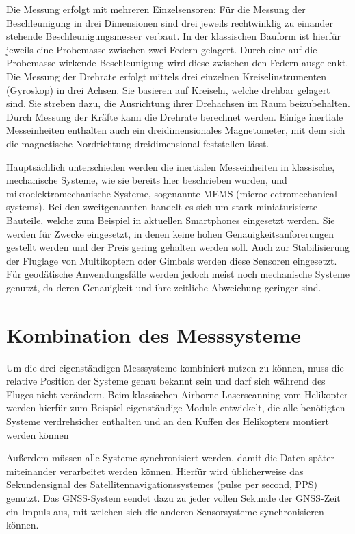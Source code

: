 \documentclass[a4paper,12pt,bibliography=totoc, listof=totoc,titlepage,pointlessnumbers]{scrreprt}
\begin{document}
Die Messung erfolgt mit mehreren Einzelsensoren: Für die Messung der Beschleunigung in drei Dimensionen sind drei jeweils rechtwinklig zu einander stehende Beschleunigungsmesser verbaut. In der klassischen Bauform ist hierfür jeweils eine Probemasse zwischen zwei Federn gelagert. Durch eine auf die Probemasse wirkende Beschleunigung wird diese zwischen den Federn ausgelenkt. Die Messung der Drehrate erfolgt mittels drei einzelnen Kreiselinstrumenten (Gyroskop) in drei Achsen. Sie basieren auf Kreiseln, welche drehbar gelagert sind. Sie streben dazu, die Ausrichtung ihrer Drehachsen im Raum beizubehalten. Durch Messung der Kräfte kann die Drehrate berechnet werden. Einige inertiale Messeinheiten enthalten auch ein dreidimensionales Magnetometer, mit dem sich die magnetische Nordrichtung dreidimensional feststellen lässt.

Hauptsächlich unterschieden werden die inertialen Messeinheiten in klassische, mechanische Systeme, wie sie bereits hier beschrieben wurden, und mikroelektromechanische Systeme, sogenannte MEMS (microelectromechanical systems). Bei den zweitgenannten handelt es sich um stark miniaturisierte Bauteile, welche zum Beispiel in aktuellen Smartphones eingesetzt werden. Sie werden für Zwecke eingesetzt, in denen keine hohen Genauigkeitsanforerungen gestellt werden und der Preis gering gehalten werden soll. Auch zur Stabilisierung der Fluglage von Multikoptern oder Gimbals werden diese Sensoren eingesetzt. Für geodätische Anwendungsfälle werden jedoch meist noch mechanische Systeme genutzt, da deren Genauigkeit und ihre zeitliche Abweichung geringer sind.


\section{Kombination des Messsysteme}
Um die drei eigenständigen Messsysteme kombiniert nutzen zu können, muss die relative Position der Systeme genau bekannt sein und darf sich während des Fluges nicht verändern. Beim klassischen Airborne Laserscanning vom Helikopter werden hierfür zum Beispiel eigenständige Module entwickelt, die alle benötigten Systeme verdrehsicher enthalten und an den Kuffen des Helikopters montiert werden können \citep[S. 23f]{beraldin}

Außerdem müssen alle Systeme synchronisiert werden, damit die Daten später miteinander verarbeitet werden können. Hierfür wird üblicherweise das Sekundensignal des Satellitennavigationssystemes (pulse per second, PPS) genutzt. Das GNSS-System sendet dazu zu jeder vollen Sekunde der GNSS-Zeit ein Impuls aus, mit welchen sich die anderen Sensorsysteme synchronisieren können. 
\end{document}

